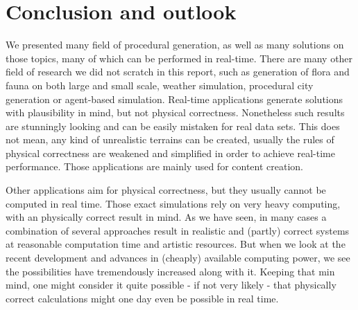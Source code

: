 \section{Conclusion and outlook}
We presented many field of procedural generation, as well as many solutions on those topics, many of which can be performed in real-time. There are many other field of research we did not scratch in this report, such as generation of flora and fauna on both large and small scale, weather simulation, procedural city generation or agent-based simulation. Real-time applications generate solutions with plausibility in mind, but not physical correctness. Nonetheless such results are stunningly looking and can be easily mistaken for real data sets. This does not mean, any kind of unrealistic terrains can be created, usually the rules of physical correctness are weakened and simplified in order to achieve real-time performance. Those applications are mainly used for content creation.

Other applications aim for physical correctness, but they usually cannot be computed in real time. Those exact simulations rely on very heavy computing, with an physically correct result in mind. As we have seen, in many cases a combination of several approaches result in realistic and (partly) correct systems at reasonable computation time and artistic resources. But when we look at the recent development and advances in (cheaply) available computing power, we see the possibilities have tremendously increased along with it. Keeping that min mind, one might consider it quite possible - if not very likely - that physically correct calculations might one day even be possible in real time.
